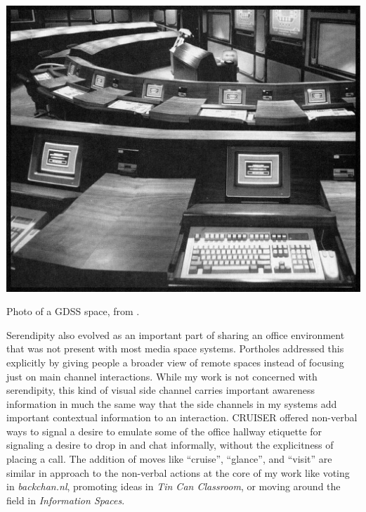 

\begin{marginfigure}
	\includegraphics{figures/nunamaker_gdss.png}
	\caption{Photo of a GDSS space, from \citep{nunamaker_electronic_1991}.}
	\label{fig:gdss}
\end{marginfigure}




Serendipity also evolved as an important part of sharing an office environment that was not present with most media space systems. Portholes \citep{Dourish:1992fu} addressed this explicitly by giving people a broader view of remote spaces instead of focusing just on main channel interactions. While my work is not concerned with serendipity, this kind of visual side channel carries important awareness information in much the same way that the side channels in my systems add important contextual information to an interaction. CRUISER \citep{Fish:1992vz} offered non-verbal ways to signal a desire to emulate some of the office hallway etiquette for signaling a desire to drop in and chat informally, without the explicitness of placing a call. The addition of moves like ``cruise'', ``glance'', and ``visit'' are similar in approach to the non-verbal actions at the core of my work like voting in \emph{backchan.nl}, promoting ideas in \emph{Tin Can Classroom}, or moving around the field in \emph{Information Spaces}. 

